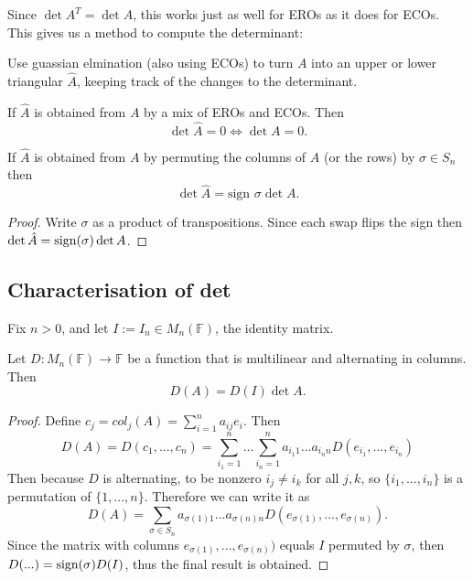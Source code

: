 \begin{remark}

  Since $\det A^T = \det A$, this works just as well for EROs as it does for ECOs.  This gives us a method to compute the determinant:

  Use guassian elmination (also using ECOs) to turn $A$ into an upper or lower triangular $\hat{A}$, keeping track of the changes to the determinant.
\end{remark}

\begin{corollary}
    If $\hat{A}$ is obtained from $A$ by a mix of EROs and ECOs. Then
    \[\det \hat{A} = 0 \iff \det A = 0.\]
\end{corollary}

\begin{corollary}
    If $\hat{A}$ is obtained from $A$ by permuting the columns of $A$ (or the rows) by $\sigma \in S_n$ then
    \[\det \hat{A} = \text{sign } \sigma \det A.\]
\end{corollary}
\begin{proof}
    Write $\sigma$ as a product of transpositions. Since each swap flips the sign then $\det \hat{A} = \operatorname{sign}(\sigma) \det A$.
\end{proof}

\subsection{Characterisation of det}

Fix $n > 0$, and let $I := I_n \in M_n(\mathbb{F})$, the identity matrix.

\begin{theorem}
    Let $D : M_n(\mathbb{F}) \rightarrow \mathbb{F}$ be a function that is multilinear and alternating in columns. Then
    \[D(A) = D(I) \det A.\]
\end{theorem}
\begin{proof}
  Define $c_j = col_j(A) = \sum_{ i = 1}^{n} a_{ij} e_i$. Then
  \[D(A) = D(c_1,...,c_n) = \sum_{ i_1 = 1}^{n} ... \sum_{ i_n = 1}^{n} a_{i_1 1} ... a_{i_n n} D(e_{i_1}, ..., e_{i_n})\]
  Then because $D$ is alternating, to be nonzero $i_j \not = i_k$ for all $j, k$, so $\{i_1,...,i_n\}$ is a permutation of $\{1,...,n\}$. Therefore we can write it as
  \[D(A) = \sum_{ \sigma \in S_n} a_{\sigma(1) 1} ... a_{\sigma(n) n} D(e_{\sigma(1)}, ..., e_{\sigma(n)}).\]
  Since the matrix with columns $e_{\sigma(1)}, ..., e_{\sigma(n)})$ equals $I$ permuted by $\sigma$, then $D(...) = \operatorname{sign}(\sigma) D(I)$, thus the final result is obtained.
\end{proof}

